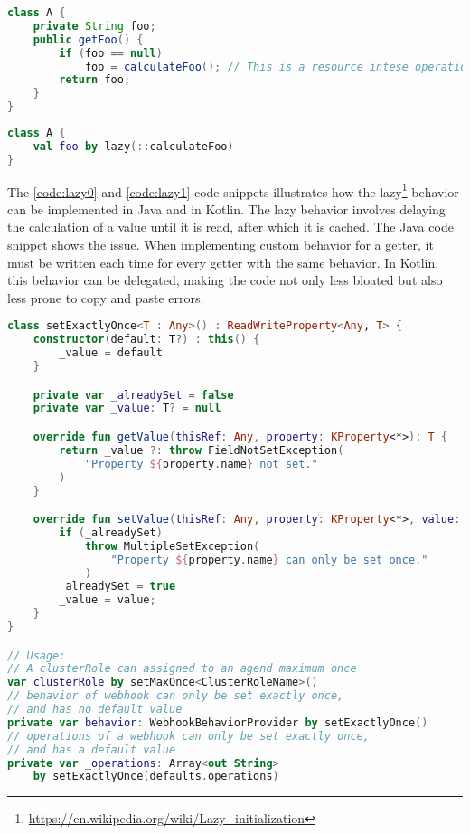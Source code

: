 \begin{lstlisting}[caption={Lazy getter in Java},language=Java,label=code:lazy0]
class A {
    private String foo;
    public getFoo() {
        if (foo == null) 
            foo = calculateFoo(); // This is a resource intese operation
        return foo;
    }
}
\end{lstlisting}
    
\begin{lstlisting}[caption={Lazy property in Kotlin},language=Kotlin,label=code:lazy1]
class A {
    val foo by lazy(::calculateFoo)
}
\end{lstlisting}

The \ref{code:lazy0} and \ref{code:lazy1} code snippets illustrates how the lazy\footnote{\url{https://en.wikipedia.org/wiki/Lazy_initialization}} behavior can be implemented in Java and in Kotlin. The lazy behavior involves delaying the calculation of a value until it is read, after which it is cached. The Java code snippet shows the issue. When implementing custom behavior for a getter, it must be written each time for every getter with the same behavior. In Kotlin, this behavior can be delegated, making the code not only less bloated but also less prone to copy and paste errors.

\begin{minipage}{\linewidth}
\begin{lstlisting}[caption={setExactlyOnce implementation},language=Kotlin,label=code:setonce]
class setExactlyOnce<T : Any>() : ReadWriteProperty<Any, T> {
    constructor(default: T?) : this() {
        _value = default
    }

    private var _alreadySet = false
    private var _value: T? = null

    override fun getValue(thisRef: Any, property: KProperty<*>): T {
        return _value ?: throw FieldNotSetException(
            "Property ${property.name} not set."
        )
    }

    override fun setValue(thisRef: Any, property: KProperty<*>, value: T) {
        if (_alreadySet)
            throw MultipleSetException(
                "Property ${property.name} can only be set once."
            )
        _alreadySet = true
        _value = value;
    }
}

// Usage:
// A clusterRole can assigned to an agend maximum once
var clusterRole by setMaxOnce<ClusterRoleName>()
// behavior of webhook can only be set exactly once,
// and has no default value
private var behavior: WebhookBehaviorProvider by setExactlyOnce()
// operations of a webhook can only be set exactly once,
// and has a default value
private var _operations: Array<out String>
    by setExactlyOnce(defaults.operations)
\end{lstlisting}
\end{minipage}

